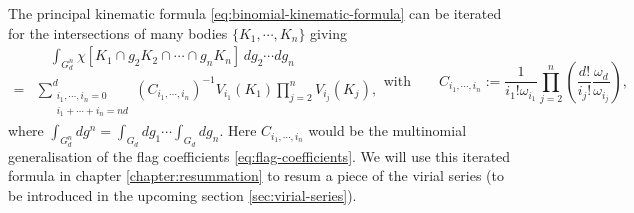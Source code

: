 The principal kinematic formula \eqref{eq:binomial-kinematic-formula} can be iterated for the intersections of many bodies $\{K_1, \cdots, K_n\}$ giving \cite{Santalo2004,MarechalPRE2014}
\begin{subequations}\label{eq:multinomial-kinematic-formula}
  \begin{equation}
    \begin{split}
      & \quad
      \int_{G_d^n} \chi[K_1 \cap g_2 K_2 \cap \cdots \cap g_n K_n]
      \, dg_2 \cdots dg_n
      \\ = &
      \sum_{\substack{i_1, \cdots, i_n = 0 \\ i_1 + \cdots + i_n = nd}}^d
      (C_{i_1, \cdots, i_n})^{-1}
      V_{i_1}(K_1)
      \prod_{j=2}^n
      V_{i_j}(K_j),
    \end{split}
  \end{equation}
  \begin{equation}
    \textrm{with} \qquad
    C_{i_1, \cdots, i_n}
    := \frac{1}{i_1! \omega_{i_1}}
    \prod_{j=2}^n
    \left(
    \frac{d!}{i_j!} \frac{\omega_d}{\omega_{i_j}}
    \right),
  \end{equation}
\end{subequations}
where $\int_{G_d^n} dg^n = \int_{G_d} dg_1 \cdots \int_{G_d} dg_n$.
Here $C_{i_1, \cdots, i_n}$ would be the multinomial generalisation of the flag coefficients \eqref{eq:flag-coefficients}.
We will use this iterated formula in chapter \ref{chapter:resummation} to resum a piece of the virial series (to be introduced in the upcoming section \ref{sec:virial-series}).


